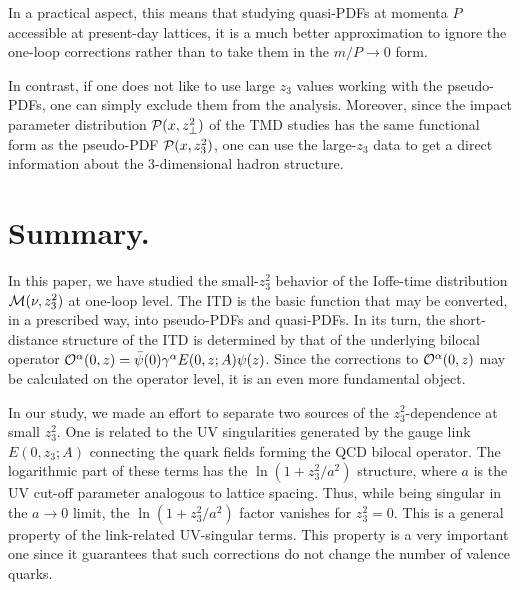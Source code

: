 \documentclass[final,5p,times,twocolumn]{elsarticle}
\begin{document}
 In a practical aspect, this means that 
 studying quasi-PDFs at momenta $P$ accessible 
at present-day lattices,  it is a much better approximation
to  ignore  the one-loop corrections  rather than to 
 take  them in the $m/P \to 0$ form.
 
In contrast,  if one does not like   to use 
 large $z_3$ values working with  the pseudo-PDFs, one can
simply exclude them  from the analysis.  
Moreover, since the impact parameter distribution
${\cal P}(x,z_\perp^2)$ of the TMD studies 
has the same  functional form as the pseudo-PDF ${\cal P}(x,z_3^2)$, 
one can use  the large-$z_3$  data to get a direct  information
about  the 3-dimensional hadron structure.


\section{ Summary.}
 
 
In this  paper, we have studied   the small-$z_3^2$
behavior of the Ioffe-time distribution  ${\cal M} (\nu, z_3^2)$ 
at one-loop level.  
The ITD is the basic function that may be converted,
in a prescribed way,  into 
pseudo-PDFs and quasi-PDFs. 
In its turn, the short-distance structure 
of the ITD is determined by that of the underlying 
bilocal operator ${\cal O}^\alpha (0,z) =\bar \psi (0) \gamma^\alpha E(0,z;A) \psi (z)$.
Since the corrections to ${\cal O}^\alpha (0,z)$ may be calculated 
on  the operator level, it is  an 
even more fundamental object.




In our study, we made an effort to
separate  two sources of the $z_3^2$-dependence 
at small   $z_3^2$. One  is related to the 
UV singularities generated by the gauge  link
$E (0,z_3;A)$  connecting the quark fields 
forming the QCD bilocal operator.
The logarithmic part of these  terms has 
the $\ln (1+z_3^2/a^2)$ structure, where 
$a$ is the UV cut-off parameter analogous to lattice spacing.
 Thus, while being 
singular in the $a\to 0$ limit, the  $\ln (1+z_3^2/a^2)$ factor 
vanishes  for $z_3^2=0$. This is a general property
of the link-related UV-singular terms.  This  property  is  a  very  important one since it 
guarantees  that such corrections do not change the number of valence quarks.
\end{document}
